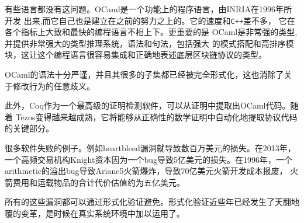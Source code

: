 \documentclass[letterpaper]{article}
\begin{document}
有些语言都没有这问题。OCaml是一个功能上的程序语言，由INRIA在1996年所开发
出来,而它自己也是建立在之前的努力之上的。它的速度和\verb!C++!差不多，
它在各个指标上大致和最快的编程语言不相上下\cite{shootout}。更重要的是
OCaml是非常强的类型,并提供非常强大的类型推理系统，语法和句法，包括强大
的模式搭配和高排序模块，这让这个编程语言很容易集成和正确地表述底层区块链协议的类型。

OCaml的语法十分严谨，并且其很多的子集都已经被完全形式化\cite{semantic}，这也消除了关于修改行为的任意歧义。

此外，Coq作为一个最高级的证明检测软件，可以从证明中提取出OCaml代码。随着
Tezos变得越来越成熟，它将能够从正确性的数学证明中自动化地提取协议代码的关键部分。

很多软件失败的例子。例如heartbleed漏洞就导致数百万美元的损失。在2013年，
一个高频交易机构Knight资本因为一个bug导致5亿美元的损失。在1996年，一个
arithmetic的溢出bug导致Ariane5火箭爆炸，导致70亿美元火箭开发成本报废，
火箭费用和运载物品的合计代价估值约为五亿美元。

所有的这些漏洞都可以通过形式化验证避免。形式化验证近些年已经发生了天翻地
覆的变革，是时候在真实系统环境中加以运用了。
\end{document}
